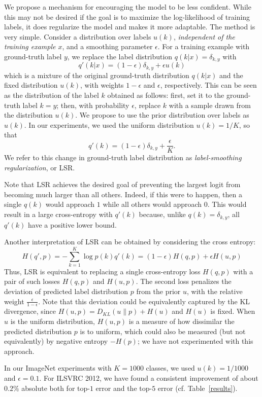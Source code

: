 We propose a mechanism for encouraging the model to be less confident. While
this may not be desired if the goal is to maximize the log-likelihood of
training labels, it does regularize the model and makes it more adaptable. The
method is very simple. Consider a distribution over labels $u(k)$, {\em
  independent of the training example $x$}, and a smoothing parameter $\epsilon$.
 For a training example with ground-truth label $y$, we
replace the label distribution $q(k|x)=\delta_{k,y}$ with
$$
q'(k|x) = (1-\epsilon) \delta_{k,y} + \epsilon u(k)
$$
which is a mixture of the original ground-truth distribution $q(k|x)$ and the
fixed distribution $u(k)$, with weights $1-\epsilon$ and $\epsilon$,
respectively. This can be seen as the distribution of the label $k$ obtained as
follows: first, set it to the ground-truth label $k=y$; then, with probability
$\epsilon$, replace $k$ with a sample drawn from the distribution $u(k)$. We
propose to use the prior distribution over labels as $u(k)$. In our experiments,
we used the uniform distribution $u(k) = 1/K$, so that
$$
q'(k) = (1-\epsilon) \delta_{k,y} + \frac{\epsilon}{K}.
$$
We refer to this change in ground-truth label distribution as {\em
  label-smoothing regularization}, or LSR.

Note that LSR achieves the desired goal of preventing the largest logit from
becoming much larger than all others. Indeed, if this were to happen, then a
single $q(k)$ would approach $1$ while all others would approach $0$. This would
result in a large cross-entropy with $q'(k)$ because, unlike
$q(k)=\delta_{k,y}$, all $q'(k)$ have a positive lower bound.

Another interpretation of LSR can be obtained by considering the cross entropy:
$$
H(q',p) = -\sum_{k=1}^K \log p(k) q'(k) = (1-\epsilon)H(q, p) + \epsilon H(u, p)
$$
Thus, LSR is equivalent to replacing a single cross-entropy loss $H(q,p)$ with a
pair of such losses $H(q,p)$ and $H(u,p)$. The second loss penalizes the
deviation of predicted label distribution $p$ from the prior $u$, with the 
relative weight $\frac{\epsilon}{1-\epsilon}$. Note that this deviation could be
equivalently captured by the KL divergence, since $H(u,p) = D_{KL}(u\|p) + H(u)$
and $H(u)$ is fixed. When $u$ is the uniform distribution, $H(u,p)$ is a measure
of how dissimilar the predicted distribution $p$ is to uniform, which could also be
measured (but not equivalently) by negative entropy $-H(p)$; we have not
experimented with this approach.

In our ImageNet experiments with $K=1000$ classes, we used $u(k) = 1/1000$ and
$\epsilon=0.1$. For ILSVRC 2012, we have found a consistent improvement of
about $0.2\%$ absolute both for top-$1$ error and the top-$5$ error
(cf. Table~\ref{results}).
